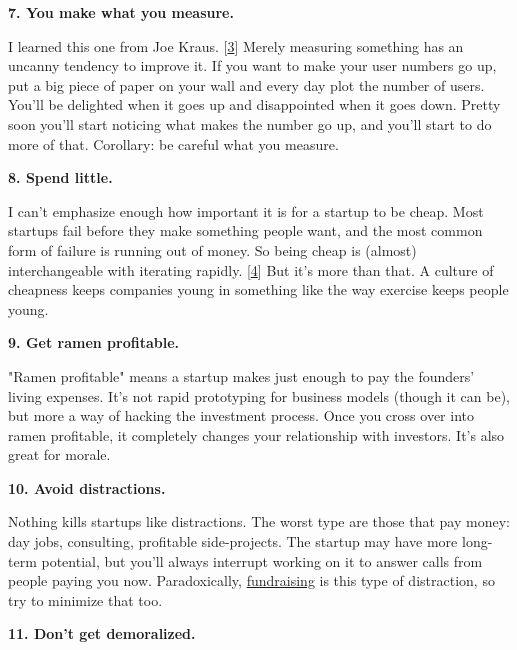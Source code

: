 \textbf{7. You make what you measure.}

I learned this one from Joe Kraus.
                    [\href{\#f3n}{3}]
                    Merely measuring something has an uncanny tendency to
                    improve it. If you want to make your user numbers go up, put
                    a big piece of paper on your wall and every day plot the
                    number of users. You'll be delighted when it goes up and
                    disappointed when it goes down. Pretty soon you'll start
                    noticing what makes the number go up, and you'll start to do
                    more of that. Corollary: be careful what you measure.

\textbf{8. Spend little.}

I can't emphasize enough how important it is
                    for a startup to be cheap. Most startups fail before they
                    make something people want, and the most common form of
                    failure is running out of money. So being cheap is (almost)
                    interchangeable with iterating rapidly.
                    [\href{\#f4n}{4}]
                    But it's more than that. A culture of cheapness keeps
                    companies young in something like the way exercise keeps
                    people young.

\textbf{9. Get ramen profitable.}

"Ramen profitable" means a startup makes just
                    enough to pay the founders' living expenses. It's not rapid
                    prototyping for business models (though it can be), but more
                    a way of hacking the investment process. Once you cross over
                    into ramen profitable, it completely changes your
                    relationship with investors. It's also great for morale.

\textbf{10. Avoid distractions.}

Nothing kills startups like distractions. The
                    worst type are those that pay money: day jobs, consulting,
                    profitable side-projects. The startup may have more
                    long-term potential, but you'll always interrupt working on
                    it to answer calls from people paying you now.
                    Paradoxically, \href{http://www.paulgraham.com/fundraising.html}{fundraising} is
                    this type of distraction, so try to minimize that too.

\textbf{11. Don't get demoralized.}


